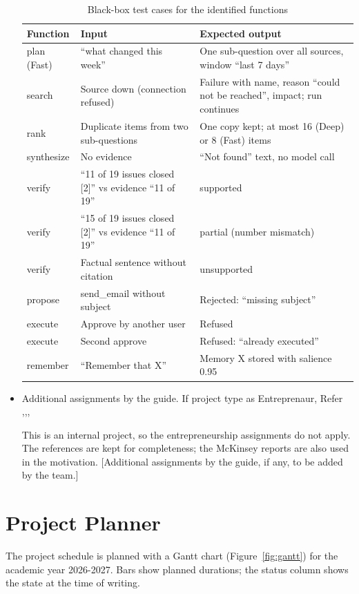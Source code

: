 \documentclass[oneside,a4paper,12pt]{report}
\begin{document}
\begin{appendices}
\begin{itemize}
\begin{table}[!htbp]
\begin{center}
\def\arraystretch{1.25}
\small
\begin{tabularx}{\textwidth}{| p{2.3cm} | X | X |}
\hline
Function & Input & Expected output \\ \hline
plan (Fast) & ``what changed this week'' & One sub-question over all sources, window ``last 7 days'' \\ \hline
search & Source down (connection refused) & Failure with name, reason ``could not be reached'', impact; run continues \\ \hline
rank & Duplicate items from two sub-questions & One copy kept; at most 16 (Deep) or 8 (Fast) items \\ \hline
synthesize & No evidence & ``Not found'' text, no model call \\ \hline
verify & ``11 of 19 issues closed [2]'' vs evidence ``11 of 19'' & supported \\ \hline
verify & ``15 of 19 issues closed [2]'' vs evidence ``11 of 19'' & partial (number mismatch) \\ \hline
verify & Factual sentence without citation & unsupported \\ \hline
propose & send\_email without subject & Rejected: ``missing subject'' \\ \hline
execute & Approve by another user & Refused \\ \hline
execute & Second approve & Refused: ``already executed'' \\ \hline
remember & ``Remember that X'' & Memory X stored with salience 0.95 \\ \hline
\end{tabularx}
\end{center}
\caption{Black-box test cases for the identified functions}
\label{tab:blackbox}
\end{table}

\item Additional assignments by the guide. If project type as Entreprenaur, Refer \cite{ehr},\cite{mckinsey},\cite{mckinseyweb}, \cite{govwebsite}

This is an internal project, so the entrepreneurship assignments do not apply. The references are kept for completeness; the McKinsey reports are also used in the motivation. [Additional assignments by the guide, if any, to be added by the team.]
\end{itemize}


\chapter{Project Planner}
\label{app:plan}
The project schedule is planned with a Gantt chart (Figure~\ref{fig:gantt}) for the academic year 2026-2027. Bars show planned durations; the status column shows the state at the time of writing.


\end{appendices}
\end{document}

